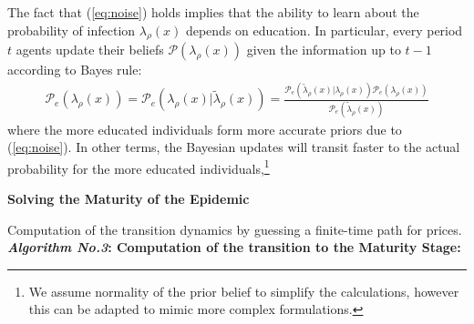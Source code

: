 The fact that (\ref{eq:noise}) holds implies that the ability to learn about the probability of infection $\lambda_\rho(x)$ depends on education. In particular, every period $t$ agents update their beliefs $\mathcal{P}(\lambda_\rho(x))$ given the information up to $t-1$ according to Bayes rule:
\begin{align}
    \mathcal{P}_{e}(\lambda_\rho(x))=\mathcal{P}_{e}(\lambda_\rho(x)|\widetilde{\lambda}_\rho(x))=\frac{\mathcal{P}_{e}(\widetilde{\lambda}_\rho(x)|\lambda_\rho(x))\mathcal{P}_e(\lambda_\rho(x))}{\mathcal{P}_{e}(\widetilde{\lambda}_\rho(x))}
\end{align}
where the more educated individuals form more accurate priors due to  (\ref{eq:noise}). In other terms, the Bayesian updates will transit faster to the actual probability for the more educated individuals,\footnote{\sf We assume normality of the prior belief to simplify the calculations, however this can be adapted to mimic more complex formulations.} 


\bigskip
\noindent \textbf{Solving the Maturity of the Epidemic}

Computation of the transition dynamics by guessing a finite-time path for prices.\\

\noindent \textbf{\textit{Algorithm No.3}: Computation of the transition to the Maturity Stage:}\\

